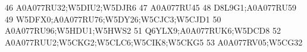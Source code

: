 \documentclass{beamer}
\begin{document}
\begin{frame}[fragile]
\begin{itemize}
\begin{Schunk}
\begin{Soutput}
46                                                                                                                                                                                                                                                                                                                                                       A0A077RU32;W5DIU2;W5DJR6
47                                                                                                                                                                                                                                                                                                                                                                     A0A077RU45
48                                                                                                                                                                                                                                                                                                                                                              D8L9G1;A0A077RU59
49                                                                                                                                                                                                                                                                                                                                         W5DFX0;A0A077RU76;W5DY26;W5CJC3;W5CJD1
50                                                                                                                                                                                                                                                                                                                                                       A0A077RU96;W5HDU1;W5HWS2
51                                                                                                                                                                                                                                                                                                                                                       Q6YLX9;A0A077RUK6;W5DCD8
52                                                                                                                                                                                                                                                                                                                                         A0A077RUU2;W5CKG2;W5CLC6;W5CIK8;W5CKG5
53                                                                                                                                                                                                                                                                                                                                                              A0A077RV05;W5CG32

\end{Soutput}
\end{Schunk}
\end{itemize}
\end{frame}
\end{document}
